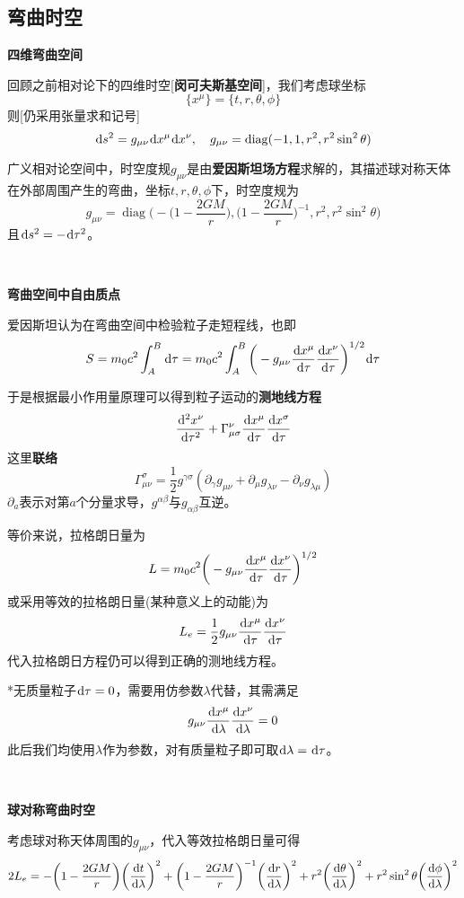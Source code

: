 \documentclass[a4paper,UTF8,fontset=windows]{ctexart}
\newcommand*{\dr}{\hspace{0.07em}\mathrm{d}}
\DeclareMathOperator{\diag}{diag}
\begin{document}
\subsection{弯曲时空}
\textbf{四维弯曲空间}

回顾之前相对论下的四维时空[\textbf{闵可夫斯基空间}]，我们考虑球坐标
$$\{x^\mu\}=\{t,r,\theta,\phi\}$$
则[仍采用张量求和记号]
$$\dr s^2=g_{\mu\nu}\dr x^\mu\dr x^\nu,\quad g_{\mu\nu}=\diag(-1,1,r^2,r^2\sin^2\theta)$$

广义相对论空间中，时空度规$g_{\mu\nu}$是由\textbf{爱因斯坦场方程}求解的，其描述球对称天体在外部周围产生的弯曲，坐标$t,r,\theta,\phi$下，时空度规为
$$g_{\mu\nu}=\diag\bigg(-\bigg(1-\frac{2GM}{r}\bigg),\bigg(1-\frac{2GM}{r}\bigg)^{-1},r^2,r^2\sin^2\theta\bigg)$$
且$\dr s^2=-\dr\tau^2$。

\

\textbf{弯曲空间中自由质点}

爱因斯坦认为在弯曲空间中检验粒子走短程线，也即
$$S=m_0c^2\int_A^B\dr\tau=m_0c^2\int_A^B\bigg(-g_{\mu\nu}\frac{\dr x^\mu}{\dr\tau}\frac{\dr x^\nu}{\dr\tau}\bigg)^{1/2}\dr\tau$$

于是根据最小作用量原理可以得到粒子运动的\textbf{测地线方程}
$$\frac{\dr^2x^\nu}{\dr\tau^2}+\Gamma_{\mu\sigma}^\nu\frac{\dr x^\mu}{\dr\tau}\frac{\dr x^\sigma}{\dr\tau}$$
这里\textbf{联络}
$$\Gamma_{\mu\nu}^\sigma=\frac{1}{2}g^{\gamma\sigma}(\partial_\gamma g_{\mu\nu}+\partial_\mu g_{\lambda\nu}-\partial_\nu g_{\lambda\mu})$$
$\partial_a$表示对第$a$个分量求导，$g^{\alpha\beta}$与$g_{\alpha\beta}$互逆。

等价来说，拉格朗日量为
$$L=m_0c^2\bigg(-g_{\mu\nu}\frac{\dr x^\mu}{\dr\tau}\frac{\dr x^\nu}{\dr\tau}\bigg)^{1/2}$$
或采用等效的拉格朗日量(某种意义上的动能)为
$$L_e=\frac{1}{2}g_{\mu\nu}\frac{\dr x^\mu}{\dr\tau}\frac{\dr x^\nu}{\dr\tau}$$
代入拉格朗日方程仍可以得到正确的测地线方程。

*无质量粒子$\dr\tau=0$，需要用仿参数$\lambda$代替，其需满足
$$g_{\mu\nu}\frac{\dr x^\mu}{\dr\lambda}\frac{\dr x^\nu}{\dr\lambda}=0$$
此后我们均使用$\lambda$作为参数，对有质量粒子即可取$\dr\lambda=\dr\tau$。

\

\textbf{球对称弯曲时空}

考虑球对称天体周围的$g_{\mu\nu}$，代入等效拉格朗日量可得
$$2L_e=-\bigg(1-\frac{2GM}{r}\bigg)\bigg(\frac{\dr t}{\dr\lambda}\bigg)^2+\bigg(1-\frac{2GM}{r}\bigg)^{-1}\bigg(\frac{\dr r}{\dr\lambda}\bigg)^2+r^2\bigg(\frac{\dr\theta}{\dr\lambda}\bigg)^2+r^2\sin^2\theta\bigg(\frac{\dr\phi}{\dr\lambda}\bigg)^2$$
\end{document}
